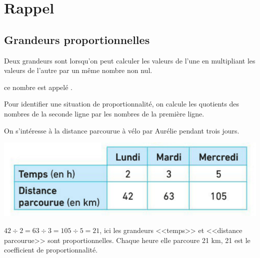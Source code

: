 \documentclass[12pt,a4paper]{article}
\date{}
\title{}
\begin{document}








\section{Rappel}

\subsection{Grandeurs proportionnelles}

\begin{mydef}
	Deux grandeurs sont  lorsqu'on peut calculer les valeurs de l'une en multipliant les valeurs de l'autre par un même nombre non nul.
	
	ce nombre est appelé .
\end{mydef}


\begin{mymeth}
	Pour identifier une situation de proportionnalité, on calcule les quotients des nombres de la seconde ligne par les nombres de la première ligne.
\end{mymeth}

\begin{myex}
	
		On s'intéresse à la distance parcourue à vélo par Aurélie pendant trois jours.
		
		\begin{center}
			\includegraphics[scale=0.5]{tab1}
		\end{center}
	

	$42 \div 2 = 63 \div 3 = 105 \div 5 = 21$, ici les grandeurs <<temps>> et <<distance parcourue>> sont proportionnelles. Chaque heure elle parcoure 21 km, 21 est le coefficient de proportionnalité.

\end{myex}	
\end{document}
